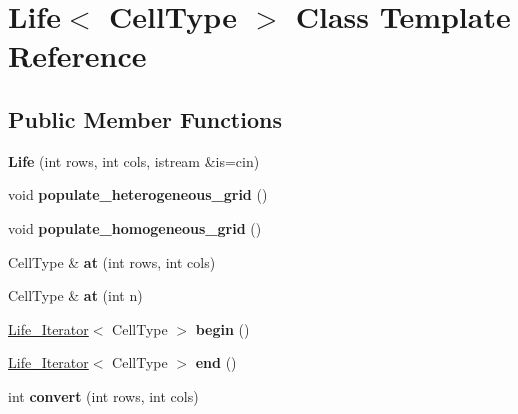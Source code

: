 \hypertarget{classLife}{\section{Life$<$ Cell\-Type $>$ Class Template Reference}
\label{classLife}
}
\subsection*{Public Member Functions}
\begin{DoxyCompactItemize}
\item 
\hypertarget{classLife_a04473ab6c263b204c9b8a862085a4200}{{\bfseries Life} (int rows, int cols, istream \&is=cin)}\label{classLife_a04473ab6c263b204c9b8a862085a4200}

\item 
\hypertarget{classLife_a3cf922d10c62e7cb828858055c19ed3e}{void {\bfseries populate\-\_\-heterogeneous\-\_\-grid} ()}\label{classLife_a3cf922d10c62e7cb828858055c19ed3e}

\item 
\hypertarget{classLife_a7643f257a1f163f466fede4298905d19}{void {\bfseries populate\-\_\-homogeneous\-\_\-grid} ()}\label{classLife_a7643f257a1f163f466fede4298905d19}

\item 
\hypertarget{classLife_ad442b2e0d970e8a9d61548a7a456f6c3}{Cell\-Type \& {\bfseries at} (int rows, int cols)}\label{classLife_ad442b2e0d970e8a9d61548a7a456f6c3}

\item 
\hypertarget{classLife_af4898790bfc58aeafb14f4f52af5e781}{Cell\-Type \& {\bfseries at} (int n)}\label{classLife_af4898790bfc58aeafb14f4f52af5e781}

\item 
\hypertarget{classLife_ac30078b08598a338b254d37672b050ae}{\hyperlink{classLife__Iterator}{Life\-\_\-\-Iterator}$<$ Cell\-Type $>$ {\bfseries begin} ()}\label{classLife_ac30078b08598a338b254d37672b050ae}

\item 
\hypertarget{classLife_a9ac3ffc992bbd32addc10354c8acae87}{\hyperlink{classLife__Iterator}{Life\-\_\-\-Iterator}$<$ Cell\-Type $>$ {\bfseries end} ()}\label{classLife_a9ac3ffc992bbd32addc10354c8acae87}

\item 
\hypertarget{classLife_a6fd0fa4a0dd7f0ef932fc187b3e11eb4}{int {\bfseries convert} (int rows, int cols)}\label{classLife_a6fd0fa4a0dd7f0ef932fc187b3e11eb4}


\end{DoxyCompactItemize}

